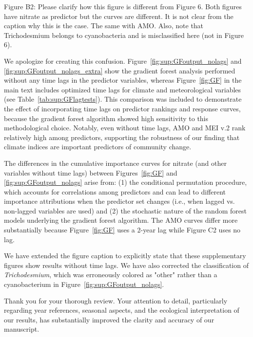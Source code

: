 \documentclass[12pt,english]{reviewresponse}
\begin{document}
\begin{revcomment}
Figure B2: Please clarify how this figure is different from Figure 6. Both figures have nitrate as predictor but the curves are different. It is not clear from the caption why this is the case. The same with AMO. Also, note that Trichodesmium belongs to cyanobacteria and is misclassified here (not in Figure 6).
\end{revcomment}
\begin{revresponse}
    We apologize for creating this confusion. Figure~\ref{fig:sup:GFoutput_nolags} and \ref{fig:sup:GFoutput_nolags_extra} show the gradient forest analysis performed without any time lags in the predictor variables, whereas Figure~\ref{fig:GF} in the main text includes optimized time lags for climate and meteorological variables (see Table~\ref{tab:sup:GFlagtests}). This comparison was included to demonstrate the effect of incorporating time lags on predictor rankings and response curves, because the gradient forest algorithm showed high sensitivity to this methodological choice. Notably, even without time lags, AMO and MEI v.2 rank relatively high among predictors, supporting the robustness of our finding that climate indices are important predictors of community change.
    
    The differences in the cumulative importance curves for nitrate (and other variables without time lags) between Figures~\ref{fig:GF} and \ref{fig:sup:GFoutput_nolags} arise from: (1) the conditional permutation procedure, which accounts for correlations among predictors and can lead to different importance attributions when the predictor set changes (i.e., when lagged vs. non-lagged variables are used) and (2) the stochastic nature of the random forest models underlying the gradient forest algorithm. The AMO curves differ more substantially because Figure~\ref{fig:GF} uses a 2-year lag while Figure C2 uses no lag.
    
    We have extended the figure caption to explicitly state that these supplementary figures show results without time lags. We have also corrected the classification of \textit{Trichodesmium}, which was erroneously colored as "other" rather than a cyanobacterium in Figure~\ref{fig:sup:GFoutput_nolags}.
\end{revresponse}


\begin{concludingresponse}[]
	Thank you for your thorough review. Your attention to detail, particularly regarding year references, seasonal aspects, and the ecological interpretation of our results, has substantially improved the clarity and accuracy of our manuscript.
\end{concludingresponse}
\end{document}
